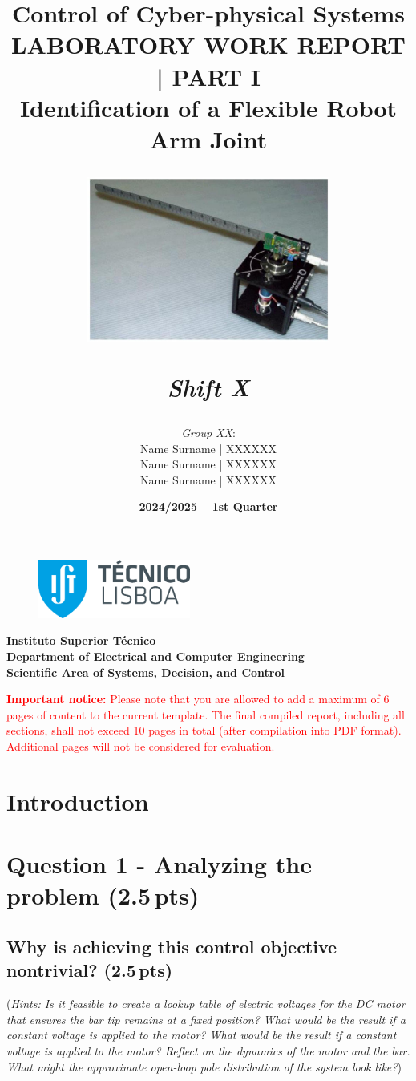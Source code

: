 \documentclass[a4paper,12pt]{article}
\title{Control of Cyber-physical Systems\\ \vspace{0.5cm} \large LABORATORY WORK REPORT | PART I\\ \vspace{0.5cm} \large Identification of a Flexible Robot Arm Joint\begin{center}
\includegraphics[width=0.6\textwidth]{Figs/2024_08_29_9e657742dc855ba919cag-01}

\vspace{15pt}
\emph{Shift X} %
\end{center}}
\author{ \emph{Group XX}: %
    \\ \tabto{0.1cm}Name Surname | XXXXXX    %
    \\ \tabto{0.1cm}Name Surname | XXXXXX
    \\ \tabto{0.1cm}Name Surname | XXXXXX
}
\date{\textbf{2024/2025 – 1st Quarter}}
\begin{document}
\begin{figure}[t]
    \flushleft
    \includegraphics[width=5cm]{Figs/IST_A_CMYK_POS.eps} 
\end{figure}

\maketitle
\begin{center}
\textbf{Instituto Superior Técnico\\ Department of Electrical and Computer Engineering\\ Scientific Area of Systems, Decision, and Control}
\end{center}
\vspace{20pt}
\textcolor{red}{\textbf{Important notice:} Please note that you are allowed to add a maximum of 6 pages of content to the current template. The final compiled report, including all sections, shall not exceed 10 pages in total (after compilation into PDF format). Additional pages will not be considered for evaluation.}






\newpage
\tableofcontents
\newpage


\section*{Introduction}
\label{sec:intro}


\section{Question 1 - Analyzing the problem (2.5\,pts)}
\label{sec:q1}

\subsection{Why is achieving this control objective nontrivial? (2.5\,pts)}
(\textit{Hints: Is it feasible to create a lookup table of electric voltages for the DC motor that ensures the bar tip remains at a fixed position? What would be the result if a constant voltage is applied to the motor? What would be the result if a constant voltage is applied to the motor? Reflect on the dynamics of the motor and the bar. What might the approximate open-loop pole distribution of the system look like?})
\vspace{15pt}
\end{document}
